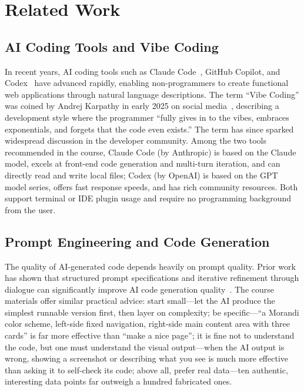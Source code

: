 \section{Related Work}

\subsection{AI Coding Tools and Vibe Coding}

In recent years, AI coding tools such as Claude Code~\cite{anthropic2025claude}, GitHub Copilot, and Codex~\cite{openai2025codex} have advanced rapidly, enabling non-programmers to create functional web applications through natural language descriptions.
The term ``Vibe Coding'' was coined by Andrej Karpathy in early 2025 on social media~\cite{karpathy2025vibe}, describing a development style where the programmer ``fully gives in to the vibes, embraces exponentials, and forgets that the code even exists.'' The term has since sparked widespread discussion in the developer community.
Among the two tools recommended in the course, Claude Code (by Anthropic) is based on the Claude model, excels at front-end code generation and multi-turn iteration, and can directly read and write local files; Codex (by OpenAI) is based on the GPT model series, offers fast response speeds, and has rich community resources.
Both support terminal or IDE plugin usage and require no programming background from the user.

\subsection{Prompt Engineering and Code Generation}

The quality of AI-generated code depends heavily on prompt quality. Prior work has shown that structured prompt specifications and iterative refinement through dialogue can significantly improve AI code generation quality~\cite{vaithilingam2022expectation}.
The course materials offer similar practical advice: start small---let the AI produce the simplest runnable version first, then layer on complexity; be specific---``a Morandi color scheme, left-side fixed navigation, right-side main content area with three cards'' is far more effective than ``make a nice page''; it is fine not to understand the code, but one must understand the visual output---when the AI output is wrong, showing a screenshot or describing what you see is much more effective than asking it to self-check its code; above all, prefer real data---ten authentic, interesting data points far outweigh a hundred fabricated ones.

